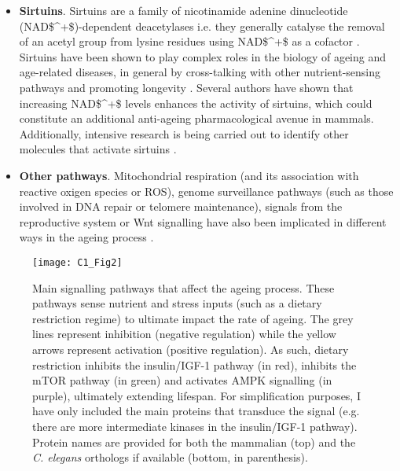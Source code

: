 \begin{itemize}
	\item \textbf{Sirtuins}. Sirtuins are a family of nicotinamide adenine dinucleotide (\acrshort{NAD$^+$})-dependent deacetylases i.e. they generally catalyse the removal of an acetyl group from lysine residues using \acrshort{NAD$^+$} as a cofactor \cite{Bonkowski2016}. Sirtuins have been shown to play complex roles in the biology of ageing and age-related diseases, in general by cross-talking with other nutrient-sensing pathways and promoting longevity \cite{Kenyon2010,Bonkowski2016}. Several authors have shown that increasing \acrshort{NAD$^+$} levels enhances the activity of sirtuins, which could constitute an additional anti-ageing pharmacological avenue in mammals. Additionally, intensive research is being carried out to identify other molecules that activate sirtuins \cite{Bonkowski2016}.
	
	\item \textbf{Other pathways}. Mitochondrial respiration (and its association with reactive oxigen species or \acrshort{ROS}), genome surveillance pathways (such as those involved in DNA repair or telomere maintenance), signals from the reproductive system or Wnt signalling have also been implicated in different ways in the ageing process \cite{Kenyon2010,Greer2008, Lezzerini2014}.
	
\end{itemize}

\begin{figure}[htbp!] 
	\centering    
	\texttt{[image: C1\_Fig2]}
	\vspace*{1 mm}
	\caption[Main signalling pathways that affect the ageing process]{Main signalling pathways that affect the ageing process. These pathways sense nutrient and stress inputs (such as a dietary restriction regime) to ultimate impact the rate of ageing. The grey lines represent inhibition (negative regulation) while the yellow arrows represent activation (positive regulation). As such, dietary restriction inhibits the insulin/IGF-1 pathway (in red), inhibits the mTOR pathway (in green) and activates AMPK signalling (in purple), ultimately extending lifespan. For simplification purposes, I have only included the main proteins that transduce the signal (e.g. there are more intermediate kinases in the insulin/IGF-1 pathway). Protein names are provided for both the mammalian (top) and the \textit{C. elegans} orthologs if available (bottom, in parenthesis).}
	\label{fig:c1_fig2}
\end{figure}

